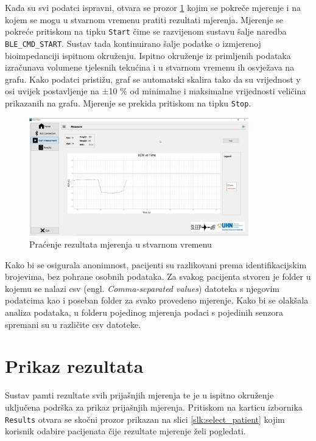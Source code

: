 \documentclass[../diplomski_rad.tex]{subfiles}
\begin{document}
Kada su svi podatci ispravni, otvara se prozor \ref{slk:measure} kojim se pokreče mjerenje i na kojem 
se mogu u stvarnom vremenu pratiti rezultati mjerenja. 
Mjerenje se pokreće pritiskom na tipku \texttt{Start} čime se razvijenom sustavu šalje naredba \texttt{BLE\_CMD\_START}. 
Sustav tada kontinuirano šalje podatke o izmjerenoj bioimpedanciji ispitnom okruženju. 
Ispitno okruženje iz primljenih podataka izračunava volumene tjelesnih tekućina i u stvarnom vremenu ih osvježava na grafu. 
Kako podatci pristižu, graf se automatski skalira tako da su vrijednost y osi uvijek postavljenje na ±10 \% 
od minimalne i maksimalne vrijednosti veličina prikazanih na grafu.   
Mjerenje se prekida pritiskom na tipku \texttt{Stop}.

\begin{figure}[htb]
    \centering
    \includegraphics[width=0.85\textwidth]{Figures/measure.png} 
    \caption{Praćenje rezultata mjerenja u stvarnom vremenu}
    \label{slk:measure}
\end{figure}

Kako bi se osigurala anonimnost, pacijenti su razlikovani prema identifikacijskim brojevima, bez pohrane osobnih podataka. 
Za svakog pacijenta stvoren je folder u kojemu se nalazi csv (engl. \textit{Comma-separated values}) datoteka s njegovim 
podatcima kao i poseban folder za svako provedeno mjerenje. 
Kako bi se olakšala analiza podataka, u folderu pojedinog mjerenja podaci s pojedinih senzora spremani su u različite csv datoteke. 

\section{Prikaz rezultata}

Sustav pamti rezultate svih prijašnjih mjerenja te je u ispitno okruženje uključena podrška za prikaz prijašnjih mjerenja. 
Pritiskom na karticu izbornika \texttt{Results} otvara se skočni prozor prikazan na slici \ref{slk:select_patient} kojim korisnik odabire pacijenata 
čije rezultate mjerenje želi pogledati.
\end{document}
